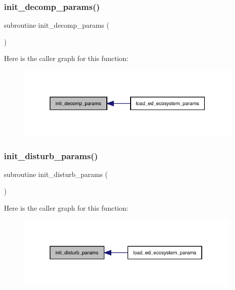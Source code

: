\subsubsection{\texorpdfstring{init\+\_\+decomp\+\_\+params()}{init\_decomp\_params()}}
{\footnotesize\ttfamily subroutine init\+\_\+decomp\+\_\+params (\begin{DoxyParamCaption}{ }\end{DoxyParamCaption})}

Here is the caller graph for this function\+:
\nopagebreak
\begin{figure}[H]
\begin{center}
\leavevmode
\includegraphics[width=314pt]{ed__params_8f90_a2caf4cbc69ad3b7681fef571ba0d787b_icgraph}
\end{center}
\end{figure}
\mbox{\label{ed__params_8f90_aae6f522b02cc842e78d5635c1399601c}} 
\subsubsection{\texorpdfstring{init\+\_\+disturb\+\_\+params()}{init\_disturb\_params()}}
{\footnotesize\ttfamily subroutine init\+\_\+disturb\+\_\+params (\begin{DoxyParamCaption}{ }\end{DoxyParamCaption})}

Here is the caller graph for this function\+:
\nopagebreak
\begin{figure}[H]
\begin{center}
\leavevmode
\includegraphics[width=310pt]{ed__params_8f90_aae6f522b02cc842e78d5635c1399601c_icgraph}
\end{center}
\end{figure}
\mbox{\label{ed__params_8f90_a51d5dbbd804bd90f13ddd0689c6e2b74}} 
